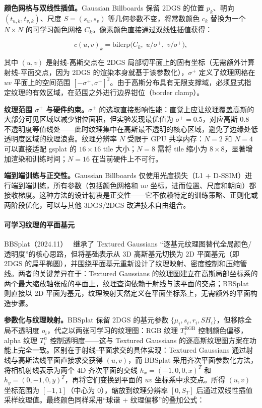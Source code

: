 \textbf{颜色网格与双线性插值。}Gaussian Billboards 保留 2DGS 的位置 $p_k$、朝向 $(t_{u,k}, t_{v,k})$、尺度 $S=(s_u, s_v)$ 等几何参数不变，将常数颜色 $c_k$ 替换为一个 $N \times N$ 的可学习颜色网格 $C_k$。像素颜色直接通过双线性插值获得：

\begin{equation}
    c(u,v)_k = \mathrm{bilerp}\bigl(C_k,\; u/\sigma^+,\; v/\sigma^+\bigr),
\end{equation}

其中 $(u,v)$ 是射线-高斯交点在 2DGS 局部切平面上的固有坐标（无需额外计算射线-平面交点，因为 2DGS 的渲染本身就基于该参数化），$\sigma^+$ 定义了纹理网格在 $uv$ 平面上的空间范围 $[-\sigma^+, \sigma^+]^2$。由于高斯分布具有无限支撑域，必须显式指定纹理的有效区域，在范围之外进行边界钳位（border clamp）。

\textbf{纹理范围 $\sigma^+$ 与硬件约束。}$\sigma^+$ 的选取直接影响性能：直觉上应让纹理覆盖高斯的大部分可见区域以减少钳位面积，但实验发现最优值为 $\sigma^+ = 0.5$，对应高斯 0.8 不透明度等值线处——此时纹理集中在高斯最不透明的核心区域，避免了边缘处低透明度区域的纹理浪费。纹理分辨率 $N$ 受限于 GPU 共享内存：$N=2$ 和 $N=4$ 可以直接适配 gsplat 的 $16 \times 16$ tile 大小；$N=8$ 需将 tile 缩小为 $8 \times 8$，显著增加渲染和训练时间；$N=16$ 在当前硬件上不可行。

\textbf{端到端训练与正交性。}Gaussian Billboards 仅使用光度损失（L1 + D-SSIM）进行端到端训练，所有参数（包括颜色网格和 $uv$ 坐标，进而位置、尺度和朝向）都接收梯度。这种方法的设计初衷是正交性——它不依赖特定的训练策略、正则化或两阶段优化，可以与其他 3DGS/2DGS 改进技术自由组合。

\paragraph{可学习纹理的平面基元}

BBSplat（2024.11）~\cite{2411_08508} 继承了 Textured Gaussians ``逐基元纹理图替代全局颜色/透明度''的核心思路，但将基础表示从 3D 高斯基元切换为 2D 平面基元（即 2DGS 的扁平椭圆），并围绕平面基元重新设计了纹理映射、密度控制和压缩管线。两者的关键差异在于：Textured Gaussians 的纹理图建立在高斯局部坐标系的两个最大缩放轴张成的平面上，纹理查询依赖于射线与该平面的交点；BBSplat 则直接以 2D 平面为基元，纹理映射天然定义在平面坐标系上，无需额外的平面构造步骤。

\textbf{参数化与纹理映射。}BBSplat 保留 2DGS 的基元参数 $\{\mu_i, s_i, r_i, SH_i\}$，但移除全局不透明度 $o_i$，代之以两张可学习的纹理图：RGB 纹理 $T_i^{\text{RGB}}$ 控制颜色偏移，alpha 纹理 $T_i^{\alpha}$ 控制透明度——这与 Textured Gaussians 的逐高斯纹理图方案在功能上完全一致。区别在于射线-平面求交的具体实现：Textured Gaussians 通过射线与高斯法线平面直接求交获得 $(u,v)$，而 BBSplat 采用齐次平面参数化方法，将相机射线表示为两个 4D 齐次平面的交线 $h_x = (-1, 0, 0, x)^T$ 和 $h_y = (0, -1, 0, y)^T$，再将它们变换到平面的 $uv$ 坐标系中求交点。所得 $(u,v)$ 坐标范围为 $[-1, 1]$（中心为 0），缩放到纹理分辨率 $[0, S_T]$ 后通过双线性插值采样纹理值。最终颜色同样采用``球谐 + 纹理偏移''的叠加公式：

